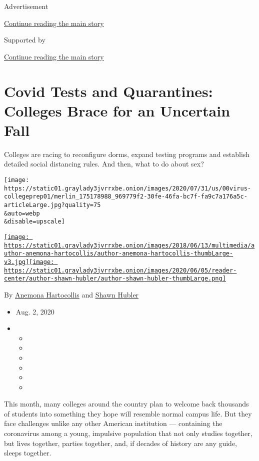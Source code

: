 Advertisement

\protect\hyperlink{after-top}{Continue reading the main story}

Supported by

\protect\hyperlink{after-sponsor}{Continue reading the main story}

\hypertarget{covid-tests-and-quarantines-colleges-brace-for-an-uncertain-fall}{%
\section{Covid Tests and Quarantines: Colleges Brace for an Uncertain
Fall}\label{covid-tests-and-quarantines-colleges-brace-for-an-uncertain-fall}}

Colleges are racing to reconfigure dorms, expand testing programs and
establish detailed social distancing rules. And then, what to do about
sex?

\texttt{[image: https://static01.graylady3jvrrxbe.onion/images/2020/07/31/us/00virus-collegeprep01/merlin\_175178988\_969779f2-30fe-46fa-bc7f-fa9c7a176a5c-articleLarge.jpg?quality=75\\\&auto=webp\\\&disable=upscale]}

\href{https://www.nytimes3xbfgragh.onion/by/anemona-hartocollis}{\texttt{[image: https://static01.graylady3jvrrxbe.onion/images/2018/06/13/multimedia/author-anemona-hartocollis/author-anemona-hartocollis-thumbLarge-v3.jpg]}}\href{https://www.nytimes3xbfgragh.onion/by/shawn-hubler}{\texttt{[image: https://static01.graylady3jvrrxbe.onion/images/2020/06/05/reader-center/author-shawn-hubler/author-shawn-hubler-thumbLarge.png]}}

By
\href{https://www.nytimes3xbfgragh.onion/by/anemona-hartocollis}{Anemona
Hartocollis} and
\href{https://www.nytimes3xbfgragh.onion/by/shawn-hubler}{Shawn Hubler}

\begin{itemize}
\item
  Aug. 2, 2020
\item
  \begin{itemize}
  \item
  \item
  \item
  \item
  \item
  \item
  \end{itemize}
\end{itemize}

This month, many colleges around the country plan to welcome back
thousands of students into something they hope will resemble normal
campus life. But they face challenges unlike any other American
institution --- containing the coronavirus among a young, impulsive
population that not only studies together, but lives together, parties
together, and, if decades of history are any guide, sleeps together.

